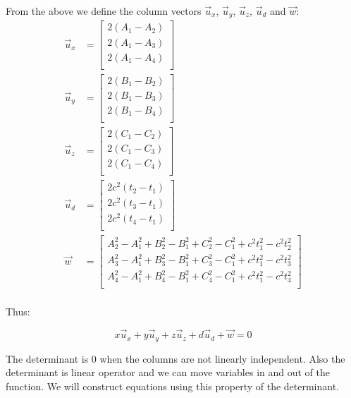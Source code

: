 \documentclass[a4paper]{article}
\begin{document}
From the above we define the column vectors $\vec{u}_x$, $\vec{u}_y$, $\vec{u}_z$, $\vec{u}_d$ and $\vec{w}$:
\begin{align}
\vec{u}_x &= \begin{bmatrix}
2(A_1 - A_2)\\
2(A_1 - A_3)\\
2(A_1 - A_4)\\
\end{bmatrix}\nonumber\\
\vec{u}_y &= \begin{bmatrix}
2(B_1 - B_2)\\
2(B_1 - B_3)\\
2(B_1 - B_4)\\
\end{bmatrix}\nonumber\\
\vec{u}_z &= \begin{bmatrix}
2(C_1 - C_2)\\
2(C_1 - C_3)\\
2(C_1 - C_4)\\
\end{bmatrix}\nonumber\\
\vec{u}_d &= \begin{bmatrix}
2c^2(t_2 - t_1)\\
2c^2(t_3 - t_1)\\
2c^2(t_4 - t_1)\\
\end{bmatrix}\nonumber\\
\vec{w} &= \begin{bmatrix}
A_2^2 - A_1^2 + B_2^2 - B_1^2 + C_2^2 - C_1^2 + c^2t_1^2 - c^2t_2^2\\
A_3^2 - A_1^2 + B_3^2 - B_1^2 + C_3^2 - C_1^2 + c^2t_1^2 - c^2t_3^2\\
A_4^2 - A_1^2 + B_4^2 - B_1^2 + C_4^2 - C_1^2 + c^2t_1^2 - c^2t_4^2\\
\end{bmatrix}\nonumber\\
\end{align}

Thus:

$$
x\vec{u}_x + y\vec{u}_y + z\vec{u}_z + d\vec{u}_d + \vec{w} = 0
$$

The determinant is $0$ when the columns are not linearly independent. Also the determinant is linear operator and we can move variables in and out of the function. We will construct equations using this property of the determinant.
\end{document}
